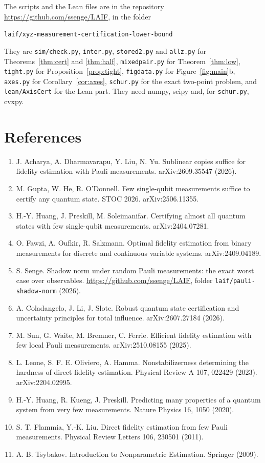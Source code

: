 \documentclass[11pt]{article}
\theoremstyle{remark}
\begin{document}
The scripts and the Lean files are in the repository \url{https://github.com/ssenge/LAIF}, in the folder
\begin{center}\texttt{laif/xyz-measurement-certification-lower-bound}\end{center}
They are \texttt{sim/check.py}, \texttt{inter.py}, \texttt{stored2.py} and \texttt{allz.py} for Theorems~\ref{thm:cert} and \ref{thm:half}, \texttt{mixedpair.py} for Theorem~\ref{thm:low}, \texttt{tight.py} for Proposition~\ref{prop:tight}, \texttt{figdata.py} for Figure~\ref{fig:main}b, \texttt{axes.py} for Corollary~\ref{cor:axes}, \texttt{schur.py} for the exact two-point problem, and \texttt{lean/AxisCert} for the Lean part. They need numpy, scipy and, for \texttt{schur.py}, cvxpy.

\section*{References}

\begin{enumerate}
\item[{[1]}] J. Acharya, A. Dharmavarapu, Y. Liu, N. Yu. Sublinear copies suffice for fidelity estimation with Pauli measurements. arXiv:2609.35547 (2026).
\item[{[2]}] M. Gupta, W. He, R. O'Donnell. Few single-qubit measurements suffice to certify any quantum state. STOC 2026. arXiv:2506.11355.
\item[{[3]}] H.-Y. Huang, J. Preskill, M. Soleimanifar. Certifying almost all quantum states with few single-qubit measurements. arXiv:2404.07281.
\item[{[4]}] O. Fawzi, A. Oufkir, R. Salzmann. Optimal fidelity estimation from binary measurements for discrete and continuous variable systems. arXiv:2409.04189.
\item[{[5]}] S. Senge. Shadow norm under random Pauli measurements: the exact worst case over observables. \url{https://github.com/ssenge/LAIF}, folder \texttt{laif/pauli-shadow-norm} (2026).
\item[{[6]}] A. Coladangelo, J. Li, J. Slote. Robust quantum state certification and uncertainty principles for total influence. arXiv:2607.27184 (2026).
\item[{[7]}] M. Sun, G. Waite, M. Bremner, C. Ferrie. Efficient fidelity estimation with few local Pauli measurements. arXiv:2510.08155 (2025).
\item[{[8]}] L. Leone, S. F. E. Oliviero, A. Hamma. Nonstabilizerness determining the hardness of direct fidelity estimation. Physical Review A 107, 022429 (2023). arXiv:2204.02995.
\item[{[9]}] H.-Y. Huang, R. Kueng, J. Preskill. Predicting many properties of a quantum system from very few measurements. Nature Physics 16, 1050 (2020).
\item[{[10]}] S. T. Flammia, Y.-K. Liu. Direct fidelity estimation from few Pauli measurements. Physical Review Letters 106, 230501 (2011).
\item[{[11]}] A. B. Tsybakov. Introduction to Nonparametric Estimation. Springer (2009).
\end{enumerate}
\end{document}
